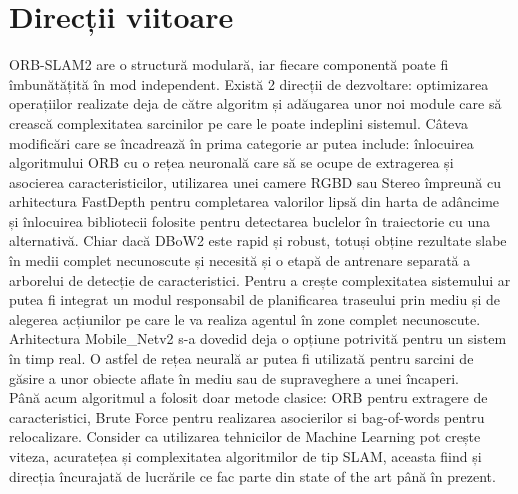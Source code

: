 \documentclass[12pt,a4paper]{report}
\begin{document}
\section{Direcții viitoare}
ORB-SLAM2 are o structură modulară, iar fiecare componentă poate fi îmbunătățită 
în mod independent. Există 2 direcții de dezvoltare: optimizarea operațiilor 
realizate deja de către algoritm și adăugarea unor noi module care să crească 
complexitatea sarcinilor pe care le poate indeplini sistemul. Câteva modificări 
care se încadrează în prima categorie ar putea include: înlocuirea algoritmului 
ORB cu o rețea neuronală care să se ocupe de extragerea și asocierea caracteristicilor,
utilizarea unei camere RGBD sau Stereo împreună cu arhitectura FastDepth pentru completarea
valorilor lipsă din harta de adâncime și înlocuirea bibliotecii folosite pentru detectarea 
buclelor în traiectorie cu una alternativă. Chiar dacă DBoW2 este rapid și robust, totuși 
obține rezultate slabe în medii complet necunoscute și necesită și o etapă de antrenare separată
a arborelui de detecție de caracteristici. Pentru a crește complexitatea sistemului ar putea
fi integrat un modul responsabil de planificarea traseului prin mediu și de alegerea 
acțiunilor pe care le va realiza agentul în zone complet necunoscute. Arhitectura 
Mobile\_Netv2 s-a dovedid deja o opțiune potrivită pentru un sistem în timp real. 
O astfel de rețea neurală ar putea fi utilizată pentru sarcini de găsire a unor 
obiecte aflate în mediu sau de supraveghere a unei încaperi. \\
Până acum algoritmul a folosit doar metode clasice: ORB pentru extragere de caracteristici,
Brute Force pentru realizarea asocierilor si bag-of-words pentru relocalizare.
Consider ca utilizarea tehnicilor de Machine Learning pot crește viteza, acuratețea 
și complexitatea algoritmilor de tip SLAM, aceasta fiind și direcția încurajată de lucrările
ce fac parte din state of the art până în prezent.
\printbibliography
\end{document}
